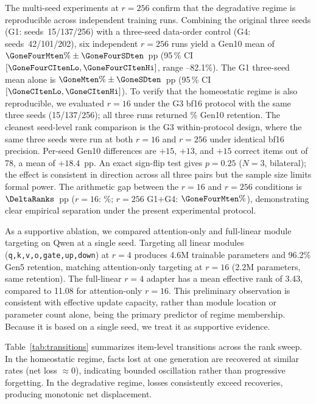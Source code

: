 \documentclass[a4paper,fleqn]{cas-dc}
\newif\ifshowchanges
\newcommand{\rev}[1]{\ifshowchanges{\color{blue}#1}\else{#1}\fi}
\begin{document}
The multi-seed experiments at $r=256$ confirm that the degradative regime is
reproducible across independent training runs.
\rev{Combining the original three seeds (G1: seeds~15/137/256) with a three-seed
data-order control (G4: seeds~42/101/202), six independent $r=256$ runs
yield a Gen10 mean of $\GoneFourMten\%\pm\GoneFourSDten$~pp
(95\,\% CI $[\GoneFourCItenLo, \GoneFourCItenHi]$, range \GoneSeedFifteenTen--82.1\%).
The G1 three-seed mean alone is $\GoneMten\%\pm\GoneSDten$~pp
(95\,\% CI $[\GoneCItenLo, \GoneCItenHi]$).}
To verify that the homeostatic regime is also reproducible, we evaluated $r=16$
under the G3 bf16 protocol with the same three seeds (15/137/256); all three runs
returned \RsixteenMten\% Gen10 retention.
\rev{The cleanest seed-level rank comparison is the G3 within-protocol design,
where the same three seeds were run at both $r=16$ and $r=256$ under identical
bf16 precision. Per-seed Gen10 differences are $+15$, $+13$, and $+15$ correct
items out of 78, a mean of $+18.4$~pp. An exact sign-flip test gives $p=0.25$
($N=3$, bilateral); the effect is consistent in direction across all three pairs
but the sample size limits formal power.}
The arithmetic gap between the $r=16$ and $r=256$ conditions is
$\DeltaRanks$~pp ($r=16$: \RsixteenMten\%; $r=256$ G1$+$G4: $\GoneFourMten\%$),
demonstrating clear empirical separation under the present experimental protocol.

As a supportive ablation, we compared attention-only and full-linear module
targeting on Qwen at a single seed. Targeting all linear modules
(\texttt{q,k,v,o,gate,up,down}) at $r=4$ produces 4.6M trainable parameters and
96.2\% Gen5 retention, matching attention-only targeting at $r=16$ (2.2M
parameters, same retention). The full-linear $r=4$ adapter has a mean effective
rank of 3.43, compared to 11.08 for attention-only $r=16$. This preliminary
observation is consistent with effective update capacity, rather than module
location or parameter count alone, being the primary predictor of regime
membership. Because it is based on a single seed, we treat it as supportive
evidence.

Table~\ref{tab:transitions} summarizes item-level transitions across the rank
sweep. In the homeostatic regime, facts lost at one generation are recovered at
similar rates (net loss $\approx 0$), indicating bounded oscillation rather than
progressive forgetting. In the degradative regime, losses consistently exceed
recoveries, producing monotonic net displacement.
\end{document}
